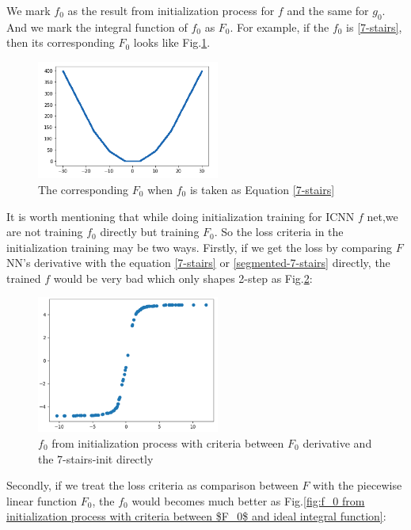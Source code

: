 \documentclass[conference,compsoc]{IEEEtran}
\begin{document}
We mark $f_0$ as the result from initialization process for $f$ and the same for $g_0$. And we mark the integral function of $f_0$ as $F_0$. For example, if the $f_0$ is \eqref{7-stairs}, then its corresponding $F_0$ looks like Fig.\ref{fig:The corresponding $F_0$ when $f_0$ is taken as Equation}.
\begin{figure}[htp]
  \centering
  \includegraphics[width=6cm]{images/piecewise_linear.png}
  \caption{The corresponding $F_0$ when $f_0$ is taken as Equation \eqref{7-stairs}}
  \label{fig:The corresponding $F_0$ when $f_0$ is taken as Equation}
\end{figure}

It is worth mentioning that while doing initialization training for ICNN $f$ net,we are not training $f_0$ directly but training $F_0$. So the loss criteria in the initialization training may be two ways. Firstly, if we get the loss by comparing $F$ NN's derivative with the equation \eqref{7-stairs} or \eqref{segmented-7-stairs} directly, the trained $f$ would be very bad which only shapes 2-step as Fig.\ref{fig:$f_0$ from initialization process with criteria between $F_0$ derivative and the 7-stairs-init directly}:

\begin{figure}[htp]
  \centering
  \includegraphics[width=6cm]{images/f_ICNN_withoutInit.png}
  \caption{$f_0$ from initialization process with criteria between $F_0$ derivative and the 7-stairs-init directly}
  \label{fig:$f_0$ from initialization process with criteria between $F_0$ derivative and the 7-stairs-init directly}
\end{figure}

Secondly, if we treat the loss criteria as comparison between $F$ with the piecewise linear function $F_0$, the $f_0$ would becomes much better as Fig.\ref{fig:f_0 from initialization process with criteria between $F_0$ and ideal integral function}:
\end{document}
